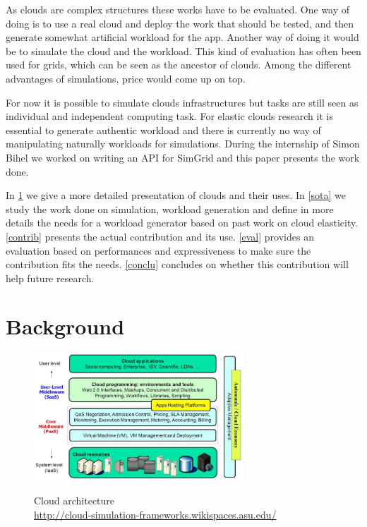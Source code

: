 \documentclass[a4paper, onecolumn]{article}
\begin{document}
  As clouds are complex structures these works have to be evaluated. One way of 
  doing is to use a real cloud and deploy the work that should be tested, and 
  then generate somewhat artificial workload for the app. Another way of doing 
  it would be to simulate the cloud and the workload. This kind of evaluation 
  has often been used for grids, which can be seen as the ancestor of clouds. 
  Among the different advantages of simulations, price would come up on top. 
  
  For now it is possible to simulate clouds infrastructures but tasks are still 
  seen as individual and independent computing task. For elastic clouds 
  research it is essential to generate authentic workload and there is 
  currently no way of manipulating naturally workloads for simulations. During 
  the internship of Simon Bihel we worked on writing an API for SimGrid and this
  paper presents the work done.
  
  In \ref{background} we give a more detailed presentation of clouds and their 
  uses. In \ref{sota} we study the work done on simulation, workload generation 
  and define in more details the needs for a workload generator based on past 
  work on cloud elasticity. \ref{contrib} presents the actual contribution and 
  its use. \ref{eval} provides an evaluation based on performances and 
  expressiveness to make sure the contribution fits the needs. \ref{conclu} 
  concludes on whether this contribution will help future research.


\section{Background} \label{background}
  \begin{figure}
    \caption{Cloud architecture \\ 
    \url{http://cloud-simulation-frameworks.wikispaces.asu.edu/}}
    \centering
    \includegraphics[width=0.7\textwidth]{../plots/cloud_architecture}
    \label{cloud_arch}
  \end{figure}
  
\end{document}
